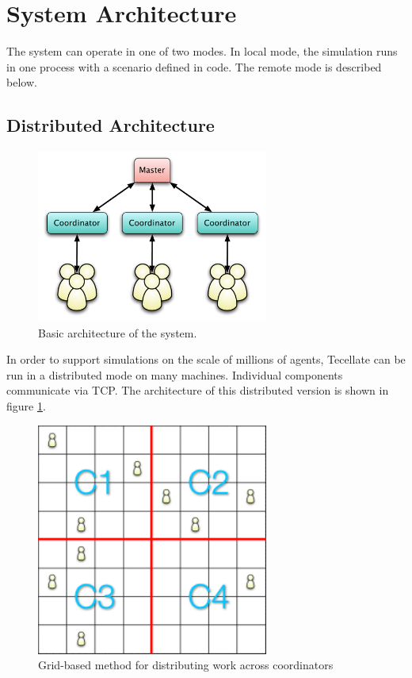 \section{System Architecture}

The system can operate in one of two modes. In local mode, the simulation runs in one process with a
scenario defined in code. The remote mode is described below.

\subsection{Distributed Architecture}

\begin{figure}
    \begin{center}
        \includegraphics[width=3in]{figures/arch0.pdf}
    \end{center}
    \caption{Basic architecture of the system.}
    \label{arch}
\end{figure}

In order to support simulations on the scale of millions of agents, Tecellate can be run in a
distributed mode on many machines. Individual components communicate via TCP. The architecture of
this distributed version is shown in figure \ref{arch}.

\begin{figure}
    \begin{center}
        \includegraphics[width=3in]{figures/arch1.png}
    \end{center}
    \caption{Grid-based method for distributing work across coordinators}
    \label{geoarch}
\end{figure}

